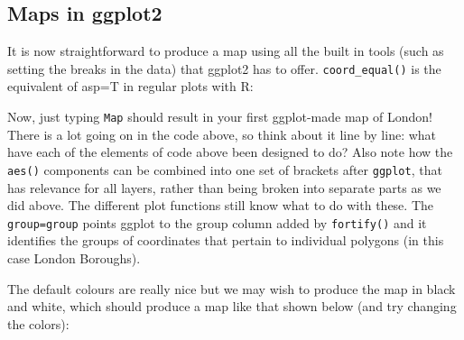 \documentclass[]{article}
\newenvironment{Shaded}{}{}
\newcommand{\KeywordTok}[1]{\textcolor[rgb]{0.00,0.44,0.13}{\textbf{{#1}}}}
\newcommand{\DataTypeTok}[1]{\textcolor[rgb]{0.56,0.13,0.00}{{#1}}}
\newcommand{\StringTok}[1]{\textcolor[rgb]{0.25,0.44,0.63}{{#1}}}
\newcommand{\NormalTok}[1]{{#1}}
\begin{document}
\subsection{Maps in ggplot2}

It is now straightforward to produce a map using all the built in tools
(such as setting the breaks in the data) that ggplot2 has to offer.
\texttt{coord\_equal()} is the equivalent of asp=T in regular plots with
R:

\begin{Shaded}
\end{Shaded}
Now, just typing \texttt{Map} should result in your first ggplot-made
map of London! There is a lot going on in the code above, so think about
it line by line: what have each of the elements of code above been
designed to do? Also note how the \texttt{aes()} components can be
combined into one set of brackets after \texttt{ggplot}, that has
relevance for all layers, rather than being broken into separate parts
as we did above. The different plot functions still know what to do with
these. The \texttt{group=group} points ggplot to the group column added
by \texttt{fortify()} and it identifies the groups of coordinates that
pertain to individual polygons (in this case London Boroughs).

The default colours are really nice but we may wish to produce the map
in black and white, which should produce a map like that shown below
(and try changing the colors):
\end{document}
